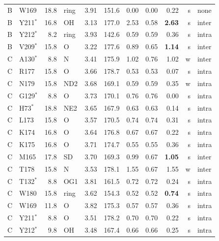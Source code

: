 {\begin{longtable}{llrlrrrrrrl}
B & W169 & 18.8 & ring & 3.91 & 151.6 & 0.00 & 0.00 & 0.22 & s & none \\
B & Y211$^{*}$ & 16.8 & OH & 3.13 & 177.0 & 2.53 & 0.58 & \textbf{2.63} & s & inter \\
B & Y212$^{*}$ & 8.2 & ring & 3.93 & 142.6 & 0.59 & 0.59 & 0.36 & s & intra \\
B & V209$^{*}$ & 15.8 & O & 3.22 & 177.6 & 0.89 & 0.65 & \textbf{1.14} & s & inter \\
C & A130$^{*}$ & 8.8 & N & 3.41 & 175.9 & 1.02 & 0.76 & 1.02 & w & inter \\
C & R177 & 15.8 & O & 3.66 & 178.7 & 0.53 & 0.53 & 0.07 & s & intra \\
C & N179 & 15.8 & ND2 & 3.68 & 169.1 & 0.59 & 0.59 & 0.35 & w & intra \\
C & G129$^{*}$ & 8.8 & O & 3.73 & 170.1 & 0.76 & 0.76 & 0.00 & s & intra \\
C & H73$^{*}$ & 18.8 & NE2 & 3.65 & 167.9 & 0.63 & 0.63 & 0.14 & s & intra \\
C & L173 & 15.8 & O & 3.57 & 170.5 & 0.74 & 0.74 & 0.31 & s & intra \\
C & K174 & 16.8 & O & 3.64 & 176.8 & 0.67 & 0.67 & 0.22 & s & intra \\
C & K175 & 16.8 & O & 3.71 & 174.7 & 0.55 & 0.55 & 0.36 & s & intra \\
C & M165 & 17.8 & SD & 3.70 & 169.3 & 0.99 & 0.67 & \textbf{1.05} & s & inter \\
C & T178 & 15.8 & N & 3.53 & 178.1 & 1.55 & 0.67 & 1.55 & w & inter \\
C & T132$^{*}$ & 8.8 & OG1 & 3.81 & 161.5 & 0.72 & 0.72 & 0.24 & s & intra \\
C & W180 & 15.8 & ring & 3.62 & 154.3 & 0.52 & 0.52 & \textbf{0.74} & s & intra \\
C & W169 & 11.8 & O & 3.82 & 175.3 & 0.57 & 0.57 & 0.36 & s & intra \\
C & Y211$^{*}$ & 8.8 & O & 3.51 & 178.2 & 0.70 & 0.70 & 0.22 & s & intra \\
C & Y212$^{*}$ & 9.8 & OH & 3.48 & 167.4 & 0.66 & 0.66 & 0.25 & s & intra \\
\end{longtable}}
